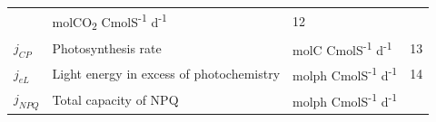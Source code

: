 \documentclass[]{elsarticle} %
\begin{document}
\begin{longtable}[c]{@{}llll@{}}
\begin{minipage}[t]{0.48\columnwidth}
\strut\end{minipage} &
\begin{minipage}[t]{0.25\columnwidth}\raggedright\strut
molCO\textsubscript{2} CmolS\textsuperscript{-1} d\textsuperscript{-1}
\strut\end{minipage} &
\begin{minipage}[t]{0.10\columnwidth}\raggedright\strut
12
\strut\end{minipage}\tabularnewline
\begin{minipage}[t]{0.10\columnwidth}\raggedright\strut
\(j_{CP}\)
\strut\end{minipage} &
\begin{minipage}[t]{0.48\columnwidth}\raggedright\strut
Photosynthesis rate
\strut\end{minipage} &
\begin{minipage}[t]{0.25\columnwidth}\raggedright\strut
molC CmolS\textsuperscript{-1} d\textsuperscript{-1}
\strut\end{minipage} &
\begin{minipage}[t]{0.10\columnwidth}\raggedright\strut
13
\strut\end{minipage}\tabularnewline
\begin{minipage}[t]{0.10\columnwidth}\raggedright\strut
\(j_{eL}\)
\strut\end{minipage} &
\begin{minipage}[t]{0.48\columnwidth}\raggedright\strut
Light energy in excess of photochemistry
\strut\end{minipage} &
\begin{minipage}[t]{0.25\columnwidth}\raggedright\strut
molph CmolS\textsuperscript{-1} d\textsuperscript{-1}
\strut\end{minipage} &
\begin{minipage}[t]{0.10\columnwidth}\raggedright\strut
14
\strut\end{minipage}\tabularnewline
\begin{minipage}[t]{0.10\columnwidth}\raggedright\strut
\(j_{NPQ}\)
\strut\end{minipage} &
\begin{minipage}[t]{0.48\columnwidth}\raggedright\strut
Total capacity of NPQ
\strut\end{minipage} &
\begin{minipage}[t]{0.25\columnwidth}\raggedright\strut
molph CmolS\textsuperscript{-1} d\textsuperscript{-1}
\strut\end{minipage} &
\begin{minipage}[t]{0.10\columnwidth}\raggedright\strut

\end{minipage}
\end{longtable}
\end{document}
